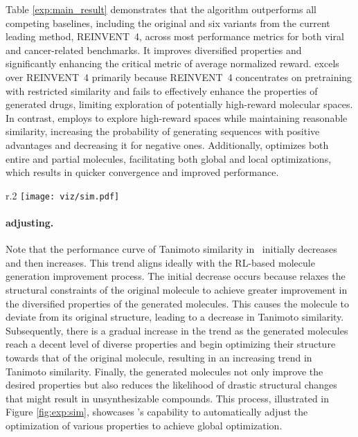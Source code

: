 Table \ref{exp:main_result} demonstrates that the \fwname algorithm outperforms all competing baselines, including the original and six variants from the current leading method, REINVENT~4, across most performance metrics for both viral and cancer-related benchmarks. 
It improves diversified properties and
significantly enhancing the critical metric of average normalized reward. 
\fwname excels over REINVENT~4 primarily because REINVENT~4 concentrates on pretraining with restricted similarity and fails to effectively enhance the properties of generated drugs, limiting exploration of potentially high-reward molecular spaces. In contrast, \fwname employs \algname to explore high-reward spaces while maintaining reasonable similarity, increasing the probability of generating sequences with positive advantages and decreasing it for negative ones. Additionally, \algname optimizes both entire and partial molecules, facilitating both global and local optimizations, which results in quicker convergence and improved performance.



\begin{wrapfigure}[9]{r}{.2\textwidth}
    \vspace{-10pt}
    \centering
    \texttt{[image: viz/sim.pdf]}
    \vspace{-7mm}
    \caption{Tanimoto Similarity over five experimental runs.}\label{fig:exp:sim}
\end{wrapfigure}
\paragraph{\algname adjusting.} 
Note that the performance curve of Tanimoto similarity in~ initially decreases and then increases. This trend aligns ideally with the RL-based molecule generation improvement process.
The initial decrease occurs because \algname relaxes the structural constraints of the original molecule to achieve greater improvement in the diversified properties of the generated molecules. This causes the molecule to deviate from its original structure, leading to a decrease in Tanimoto similarity. 
Subsequently, there is a gradual increase in the trend as the generated molecules reach a decent level of diverse properties and begin optimizing their structure towards that of the original molecule, resulting in an increasing trend in Tanimoto similarity. Finally, the generated molecules not only improve the desired properties but also reduces the likelihood of drastic structural changes that might result in unsynthesizable compounds. 
{This process, illustrated in Figure \ref{fig:exp:sim}, showcases \algname's capability to automatically adjust the optimization of various properties to achieve global optimization.}






















